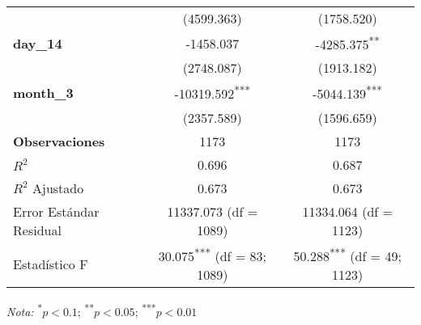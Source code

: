 \documentclass{article}
\begin{document}
\begin{table}[h!]
\begin{threeparttable}
\begin{tabular}{@{}lcc@{}}
 & (4599.363) & (1758.520) \\
\textbf{day\_14} & -1458.037 & -4285.375\textsuperscript{**} \\
 & (2748.087) & (1913.182) \\
\textbf{month\_3} & -10319.592\textsuperscript{***} & -5044.139\textsuperscript{***} \\
 & (2357.589) & (1596.659) \\
\midrule
\textbf{Observaciones} & 1173 & 1173 \\
$R^{2}$ & 0.696 & 0.687 \\
$R^{2}$ Ajustado & 0.673 & 0.673 \\
Error Estándar Residual & 11337.073 (df = 1089) & 11334.064 (df = 1123) \\
Estadístico F & 30.075\textsuperscript{***} (df = 83; 1089) & 50.288\textsuperscript{***} (df = 49; 1123) \\
\bottomrule
\end{tabular}
\begin{tablenotes}
\item \textit{Nota:} \textsuperscript{*}$p<0.1$; \textsuperscript{**}$p<0.05$; \textsuperscript{***}$p<0.01$
\end{tablenotes}
\end{threeparttable}
\end{table}
\end{document}

